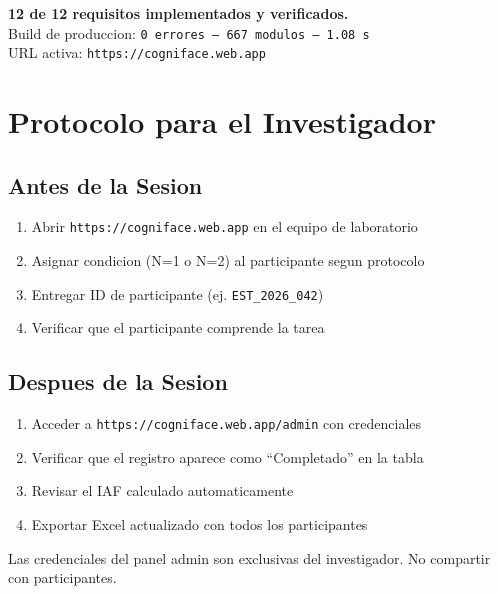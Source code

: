 \documentclass[12pt,a4paper]{article}
\begin{document}
\begin{tcolorbox}[successbox, title={Resultado del Balance}]
\textbf{12 de 12 requisitos implementados y verificados.}\\[0.3em]
Build de produccion: \texttt{0 errores --- 667 modulos --- 1.08 s}\\
URL activa: \texttt{https://cogniface.web.app}
\end{tcolorbox}

\section{Protocolo para el Investigador}

\subsection{Antes de la Sesion}
\begin{enumerate}[leftmargin=1.5em]
  \item Abrir \texttt{https://cogniface.web.app} en el equipo de laboratorio
  \item Asignar condicion (N=1 o N=2) al participante segun protocolo
  \item Entregar ID de participante (ej. \texttt{EST\_2026\_042})
  \item Verificar que el participante comprende la tarea
\end{enumerate}

\subsection{Despues de la Sesion}
\begin{enumerate}[leftmargin=1.5em]
  \item Acceder a \texttt{https://cogniface.web.app/admin} con credenciales
  \item Verificar que el registro aparece como ``Completado'' en la tabla
  \item Revisar el IAF calculado automaticamente
  \item Exportar Excel actualizado con todos los participantes
\end{enumerate}

\begin{tcolorbox}[warnbox, title={Seguridad del acceso}]
Las credenciales del panel admin son exclusivas del investigador.
No compartir con participantes.
\end{tcolorbox}
\end{document}
